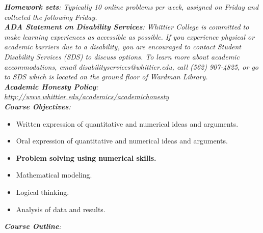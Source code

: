 \documentclass[10pt]{article}
\begin{document}
\textit{\textbf{Homework sets}: Typically 10 online problems per week, assigned on Friday and collected the following Friday.} \\
\textit{\textbf{ADA Statement on Disability Services}: Whittier College is committed to make learning experiences as accessible as possible. If you experience physical or academic barriers due to a disability, you are encouraged to contact Student Disability Services (SDS) to discuss options. To learn more about academic accommodations, email disabilityservices@whittier.edu, call (562) 907-4825, or go to SDS which is located on the ground floor of Wardman Library.} \\
\textit{\textbf{Academic Honesty Policy}: \url{http://www.whittier.edu/academics/academichonesty}} \\
\textit{\textbf{Course Objectives}:}
\begin{itemize}
\item Written expression of quantitative and numerical ideas and arguments.
\item Oral expression of quantitative and numerical ideas and arguments.
\item \textbf{Problem solving using numerical skills.}
\item Mathematical modeling.
\item Logical thinking.
\item Analysis of data and results.
\end{itemize}
\clearpage
\textit{\textbf{Course Outline}:}
\end{document}
